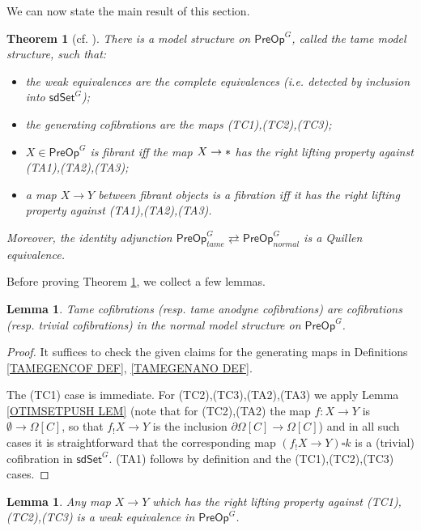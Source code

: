 \documentclass[a4paper,10pt
,draft
]{article}%
\numberwithin{equation}{section}
\numberwithin{figure}{section}
\newtheorem{theorem}[equation]{Theorem}%
\newtheorem{lemma}[equation]{Lemma}%
\theoremstyle{definition} %
\newcommand{\1}{\ensuremath{\mathbbm 1}}%
\begin{document}
We can now state the main result of this section.

\begin{theorem}[{cf. \cite[Thm. 7.19]{CM13b}}]
      \label{TAMEMS_THM}
	There is a model structure on 
	$\mathsf{PreOp}^G$,
	called the \emph{tame model structure},
	such that:
	\begin{itemize}
		\item the weak equivalences are the complete equivalences (i.e. detected by inclusion into 
		$\mathsf{sdSet}^G$);
		\item the generating cofibrations are the maps (TC1),(TC2),(TC3);
		\item $X \in \mathsf{PreOp}^G$ is fibrant iff
		the map $X \to \**$ has the right lifting property against 
		(TA1),(TA2),(TA3);
		\item a map $X \to Y$ between fibrant objects is a fibration iff
		it has the right lifting property against 
		(TA1),(TA2),(TA3).
	\end{itemize}
	Moreover, the identity adjunction
	$
	\mathsf{PreOp}^G_{tame} 
	\rightleftarrows
	\mathsf{PreOp}^G_{normal} 
	$
	is a Quillen equivalence.
\end{theorem}


Before proving Theorem \ref{TAMEMS_THM},
we collect a few lemmas.

\begin{lemma}\label{TAMECOFCOF_LEM}
	Tame cofibrations (resp. tame anodyne cofibrations) are  cofibrations (resp. trivial cofibrations) in the normal model structure on $\mathsf{PreOp}^G$.
\end{lemma}


\begin{proof}
	It suffices to check the given claims for the generating maps
	in Definitions \ref{TAMEGENCOF DEF}, \ref{TAMEGENANO DEF}.
	
	The (TC1) case is immediate.
	For (TC2),(TC3),(TA2),(TA3)
	we apply 
	Lemma \ref{OTIMSETPUSH LEM}
	(note that for (TC2),(TA2)
	the map $f\colon X \to Y$ is $\emptyset \to \Omega[C]$,
	so that $f_!X \to Y$ is the inclusion
	$\partial \Omega[C] \to \Omega[C]$)
	and in all such cases it is 
	straightforward that the 
	corresponding map $(f_!X \to Y) \square k$
	is a (trivial) cofibration in $\mathsf{sdSet}^G$.
	(TA1) follows by definition and the 
	(TC1),(TC2),(TC3) cases.
\end{proof}



\begin{lemma}\label{TAMETRIVFIB LEM}
	Any map $X \to Y$ which has the right lifting property against 
	(TC1),(TC2),(TC3)
	is a weak equivalence in 
	$\mathsf{PreOp}^G$.
\end{lemma}
\end{document}
